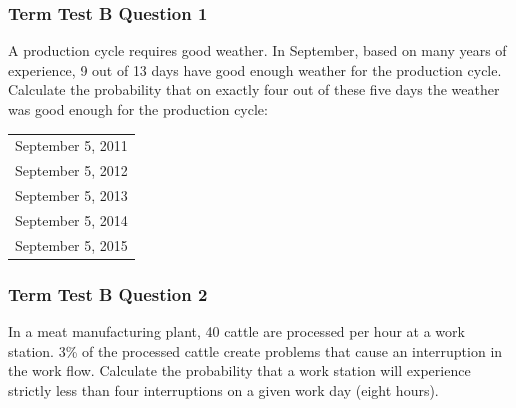 \documentclass[xcolor=dvipsnames]{beamer}
\newcommand{\puw}{9}
\newcommand{\iex}{13}
\newcommand{\nae}{40}
\newcommand{\mih}{3}
\begin{document}



\begin{frame}
  \frametitle{Term Test B Question 1}
A production cycle requires good weather. In September,
based on many years of experience, {\puw} out of {\iex} days have good enough
weather for the production cycle. Calculate the probability that
on exactly four out of these five days the weather was good enough for
the production cycle:

\begin{tabular}{l}
  September 5, 2011 \\
  September 5, 2012 \\
  September 5, 2013 \\
  September 5, 2014 \\
  September 5, 2015 \\
\end{tabular}
\end{frame}

\begin{frame}
  \frametitle{Term Test B Question 2}
  In a meat manufacturing plant, {\nae} cattle are processed per
hour at a work station. {\mih}\% of the processed cattle create problems
that cause an interruption in the work flow. Calculate the probability
that a work station will experience strictly less than four
interruptions on a given work day (eight hours). 
\end{frame}
\end{document}

